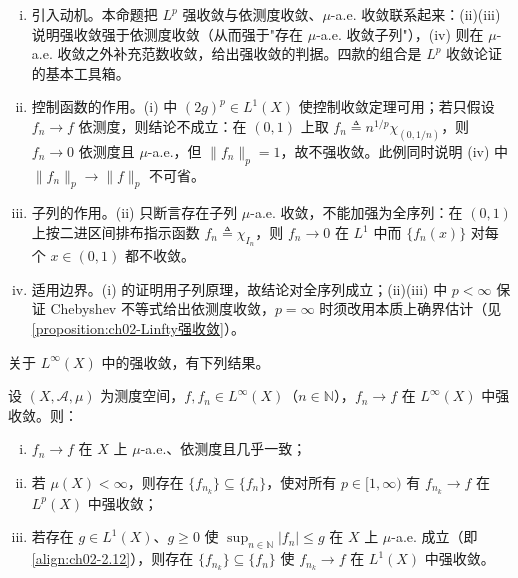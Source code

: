 \documentclass[../../main.tex]{subfiles}%
\begin{document}
\begin{remark}\label{remark:ch02-强收敛性质}
\begin{enumerate}[(i)]
\item 引入动机。本命题把 $L^p$ 强收敛与依测度收敛、$\mu$-a.e. 收敛联系起来：(ii)(iii) 说明强收敛强于依测度收敛（从而强于"存在 $\mu$-a.e. 收敛子列"），(iv) 则在 $\mu$-a.e. 收敛之外补充范数收敛，给出强收敛的判据。四款的组合是 $L^p$ 收敛论证的基本工具箱。
\item 控制函数的作用。(i) 中 $(2g)^p\in L^1(X)$ 使控制收敛定理可用；若只假设 $f_n\to f$ 依测度，则结论不成立：在 $(0,1)$ 上取 $f_n\triangleq n^{1/p}\chi_{(0,1/n)}$，则 $f_n\to0$ 依测度且 $\mu$-a.e.，但 $\|f_n\|_p=1$，故不强收敛。此例同时说明 (iv) 中 $\|f_n\|_p\to\|f\|_p$ 不可省。
\item 子列的作用。(ii) 只断言存在子列 $\mu$-a.e. 收敛，不能加强为全序列：在 $(0,1)$ 上按二进区间排布指示函数 $f_n\triangleq\chi_{I_n}$，则 $f_n\to0$ 在 $L^1$ 中而 $\{f_n(x)\}$ 对每个 $x\in(0,1)$ 都不收敛。
\item 适用边界。(i) 的证明用子列原理，故结论对全序列成立；(ii)(iii) 中 $p<\infty$ 保证 Chebyshev 不等式给出依测度收敛，$p=\infty$ 时须改用本质上确界估计（见\cref{proposition:ch02-Linfty强收敛}）。
\end{enumerate}
\end{remark}

关于 $L^\infty(X)$ 中的强收敛，有下列结果。

\begin{proposition}\label{proposition:ch02-Linfty强收敛}
设 $(X,\mathscr A,\mu)$ 为测度空间，$f,f_n\in L^\infty(X)$（$n\in\mathbb N$），$f_n\to f$ 在 $L^\infty(X)$ 中强收敛。则：
\begin{enumerate}[(i)]
\item $f_n\to f$ 在 $X$ 上 $\mu$-a.e.、依测度且几乎一致；
\item 若 $\mu(X)<\infty$，则存在 $\{f_{n_k}\}\subseteq\{f_n\}$，使对所有 $p\in[1,\infty)$ 有 $f_{n_k}\to f$ 在 $L^p(X)$ 中强收敛；
\item 若存在 $g\in L^1(X)$、$g\geqslant0$ 使 $\sup_{n\in\mathbb N}|f_n|\leqslant g$ 在 $X$ 上 $\mu$-a.e. 成立（即\eqref{align:ch02-2.12}），则存在 $\{f_{n_k}\}\subseteq\{f_n\}$ 使 $f_{n_k}\to f$ 在 $L^1(X)$ 中强收敛。
\end{enumerate}
\end{proposition}
\end{document}
